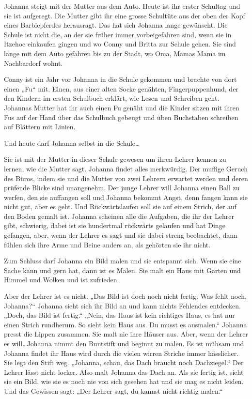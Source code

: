 \documentclass[10pt,titlepage,a5paper]{book}
\begin{document}
Johanna steigt mit der Mutter aus dem Auto. Heute ist ihr erster Schultag und sie ist aufgeregt. Die Mutter gibt ihr eine grosse Schultüte aus der oben der Kopf eines Barbiepferdes herausragt. Das hat sich Johanna lange gewünscht. Die Schule ist nicht die, an der sie früher immer vorbeigefahren sind, wenn sie in Itzehoe einkaufen gingen und wo Conny und Britta zur Schule gehen. Sie sind lange mit dem Auto gefahren bis zu der Stadt, wo Oma, Mamas Mama im Nachbardorf wohnt.

Conny ist ein Jahr vor Johanna in die Schule gekommen und brachte von dort einen „Fu“ mit. Einen, aus einer alten Socke genähten, Fingerpuppenhund, der den Kindern im ersten Schulbuch erklärt, wie Lesen und Schreiben geht. Johannas Mutter hat ihr auch einen Fu genäht und die Kinder sitzen mit ihren Fus auf der Hand über das Schulbuch gebeugt und üben Buchstaben schreiben auf Blättern mit Linien.

Und heute darf Johanna selbst in die Schule\dots

Sie ist mit der Mutter in dieser Schule gewesen um ihren Lehrer kennen zu lernen, wie die Mutter sagt. Johanna findet alles merkwürdig. Der muffige Geruch des Büros, indem sie und die Mutter von zwei Lehrern erwartet werden und deren prüfende Blicke sind unangenehm. Der junge Lehrer will Johanna einen Ball zu werfen, den sie auffangen soll und Johanna bekommt Angst, denn fangen kann sie nicht gut, aber es geht. Und Rückwärtslaufen soll sie auf einem Strich, der auf den Boden gemalt ist. Johanna scheinen alle die Aufgaben, die ihr der Lehrer gibt, schwierig, dabei ist sie hundertmal rückwärts gelaufen und hat Dinge gefangen, aber, wenn der Lehrer es sagt und sie dabei streng beobachtet, dann fühlen sich ihre Arme und Beine anders an, als gehörten sie ihr nicht.

Zum Schluss darf Johanna ein Bild malen und sie entspannt sich. Wenn sie eine Sache kann und gern hat, dann ist es Malen. Sie malt ein Haus mit Garten und Himmel und Wolken und ist zufrieden. 

Aber der Lehrer ist es nicht. „Das Bild ist doch noch nicht fertig. Was fehlt noch, Johanna?“  Johanna sieht sich ihr Bild an und kann nichts Fehlendes entdecken. „Doch, das Bild ist fertig.“ „Nein, das Haus ist kein richtiges Haus, es hat nur einen Strich rundherum. So sieht kein Haus aus. Du musst es ausmalen.“ Johanna presst die Lippen zusammen. Sie malt nie ihre Häuser aus. Aber, wenn der Lehrer es will\dots Johanna nimmt den Buntstift und beginnt zu malen. Es ist mühsam und Johanna findet ihr Haus wird durch die vielen wirren Striche immer hässlicher. Sie legt den Stift weg. „Johanna, schau, das Dach braucht noch Dachziegel.“ Der Lehrer lässt nicht locker. Also malt Johanna das Dach an. Als sie fertig ist, sieht sie ein Bild, wie sie es noch nie von sich gesehen hat und sie mag es nicht leiden. Und das Gewissen sagt: „Der Lehrer sagt, du kannst nicht richtig malen.“
\end{document}
